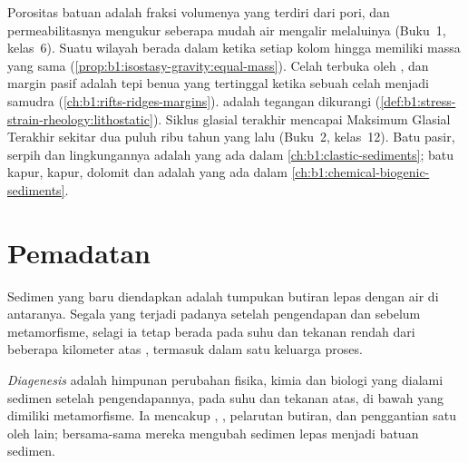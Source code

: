 \begin{recall}
Porositas batuan adalah fraksi volumenya yang terdiri dari pori, dan permeabilitasnya mengukur seberapa mudah air mengalir melaluinya (Buku~1, kelas~6). Suatu wilayah berada dalam  ketika setiap kolom hingga  memiliki massa yang sama (\cref{prop:b1:isostasy-gravity:equal-mass}). Celah terbuka oleh , dan margin pasif adalah tepi benua yang tertinggal ketika sebuah celah menjadi samudra (\cref{ch:b1:rifts-ridges-margins}).  adalah tegangan dikurangi  (\cref{def:b1:stress-strain-rheology:lithostatic}). Siklus glasial terakhir mencapai Maksimum Glasial Terakhir sekitar dua puluh ribu tahun yang lalu (Buku~2, kelas~12). Batu pasir, serpih dan lingkungannya adalah yang ada dalam \cref{ch:b1:clastic-sediments}; batu kapur, kapur, dolomit dan  adalah yang ada dalam \cref{ch:b1:chemical-biogenic-sediments}.
\end{recall}

\section{Pemadatan}\label{sec:b1:diagenesis-basins:compaction}

Sedimen yang baru diendapkan adalah tumpukan butiran lepas dengan air di antaranya. Segala yang terjadi padanya setelah pengendapan dan sebelum metamorfisme, selagi ia tetap berada pada suhu dan tekanan rendah dari beberapa kilometer atas , termasuk dalam satu keluarga proses.

\begin{definition}\label{def:b1:diagenesis-basins:diagenesis}
\emph{Diagenesis} adalah himpunan perubahan fisika, kimia dan biologi yang dialami sedimen setelah pengendapannya, pada suhu dan tekanan  atas, di bawah yang dimiliki metamorfisme. Ia mencakup , , pelarutan butiran, dan penggantian satu  oleh  lain; bersama-sama mereka mengubah sedimen lepas menjadi batuan sedimen.
\end{definition}

